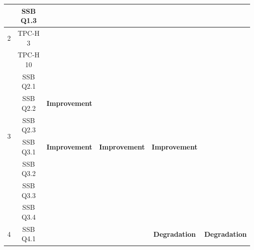 \begin{table}[]
{\begin{tabular}{@{}cccccc@{}}
                                 & SSB Q1.3               & \multicolumn{1}{c}{}                     & \multicolumn{1}{c}{}                     & \multicolumn{1}{c}{}                     &                      \\ \midrule
    2                            & TPC-H 3                & \multicolumn{1}{c}{}                     & \multicolumn{1}{c}{}                     & \multicolumn{1}{c}{}                     &                      \\ \midrule
    \multirow{8}{*}{3}           & TPC-H 10               & \multicolumn{1}{c}{}                     & \multicolumn{1}{c}{}                     & \multicolumn{1}{c}{}                     &                      \\  
                                 & SSB Q2.1               & \multicolumn{1}{c}{}                     & \multicolumn{1}{c}{}                     & \multicolumn{1}{c}{}                     &                      \\  
                                 & SSB Q2.2               & \multicolumn{1}{c}{\textbf{Improvement}} & \multicolumn{1}{c}{}                     & \multicolumn{1}{c}{}                     &                      \\  
                                 & SSB Q2.3               & \multicolumn{1}{c}{}                     & \multicolumn{1}{c}{}                     & \multicolumn{1}{c}{}                     &                      \\  
                                 & SSB Q3.1               & \multicolumn{1}{c}{\textbf{Improvement}} & \multicolumn{1}{c}{\textbf{Improvement}} & \multicolumn{1}{c}{\textbf{Improvement}} &                      \\  
                                 & SSB Q3.2               & \multicolumn{1}{c}{}                     & \multicolumn{1}{c}{}                     & \multicolumn{1}{c}{}                     &                      \\  
                                 & SSB Q3.3               & \multicolumn{1}{c}{}                     & \multicolumn{1}{c}{}                     & \multicolumn{1}{c}{}                     &                      \\  
                                 & SSB Q3.4               & \multicolumn{1}{c}{}                     & \multicolumn{1}{c}{}                     & \multicolumn{1}{c}{}                     &                      \\ \midrule
    \multirow{3}{*}{4}           & SSB Q4.1               & \multicolumn{1}{c}{}                     & \multicolumn{1}{c}{}                     & \multicolumn{1}{c}{\textbf{Degradation}} & \textbf{Degradation} \\  

\end{tabular}}
\end{table}
